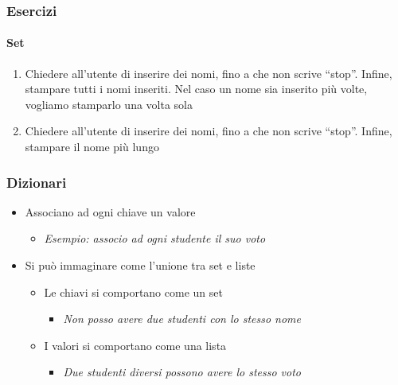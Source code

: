 \begin{exerciseframe}
    \frametitle{Esercizi}
    \framesubtitle{Set}

    \begin{enumerate}
        \item Chiedere all'utente di inserire dei nomi, fino a che non scrive ``stop''. Infine, stampare tutti i nomi inseriti. Nel caso un nome sia inserito più volte, vogliamo stamparlo una volta sola

        \bigskip
        \item Chiedere all'utente di inserire dei nomi, fino a che non scrive ``stop''. Infine, stampare il nome più lungo
    \end{enumerate}
\end{exerciseframe}

\begin{contentframe}
    \frametitle{Dizionari}

    \begin{itemize}
        \item Associano ad ogni chiave un valore
        \begin{itemize}
            \item \textit{Esempio: associo ad ogni studente il suo voto}
        \end{itemize}

        \bigskip
        \item Si può immaginare come l'unione tra set e liste
        \begin{itemize}
            \item Le chiavi si comportano come un set
            \begin{itemize}
                \item \textit{Non posso avere due studenti con lo stesso nome}
            \end{itemize}
            \item I valori si comportano come una lista
            \begin{itemize}
                \item \textit{Due studenti diversi possono avere lo stesso voto}
            \end{itemize}
        \end{itemize}
    \end{itemize}
\end{contentframe}

